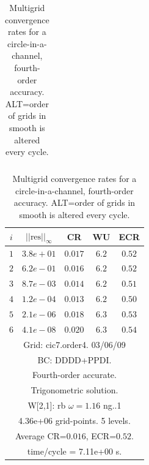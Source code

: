 \begin{table}[hbt]
\begin{center}
{\begin{tabular}{|c|c|c|c|c|}
\hline 
\end{tabular}
\begin{tabular}{|c|c|c|c|c|} \hline 
 $i$   & $\vert\vert\mbox{res}\vert\vert_\infty$  &  CR     &  WU    & ECR  \\   \hline 
 $ 1$  & $ 3.8e+01$ & $0.017$ & $ 6.2$ & $0.52$ \\ 
 $ 2$  & $ 6.2e-01$ & $0.016$ & $ 6.2$ & $0.52$ \\ 
 $ 3$  & $ 8.7e-03$ & $0.014$ & $ 6.2$ & $0.51$ \\ 
 $ 4$  & $ 1.2e-04$ & $0.013$ & $ 6.2$ & $0.50$ \\ 
 $ 5$  & $ 2.1e-06$ & $0.018$ & $ 6.3$ & $0.53$ \\ 
 $ 6$  & $ 4.1e-08$ & $0.020$ & $ 6.3$ & $0.54$ \\ 
\hline 
\multicolumn{5}{|c|}{Grid: cic7.order4. 03/06/09}  \\
\multicolumn{5}{|c|}{BC: DDDD+PPDI.}  \\
\multicolumn{5}{|c|}{Fourth-order accurate.}  \\
\multicolumn{5}{|c|}{Trigonometric solution.}  \\
\multicolumn{5}{|c|}{W[2,1]: rb $\omega=1.16$ ng..1}  \\
\multicolumn{5}{|c|}{4.36e+06 grid-points. 5 levels.}  \\
\multicolumn{5}{|c|}{Average CR=$0.016$, ECR=$0.52$.}  \\
\multicolumn{5}{|c|}{time/cycle = 7.11e+00 s.}  \\
\hline 
\end{tabular}
} %
\end{center}
\caption{Multigrid convergence rates for a circle-in-a-channel, fourth-order accuracy.
  ALT=order of grids in smooth is altered every cycle.}
 \label{tab:cic4} 
\end{table}



\clearpage
